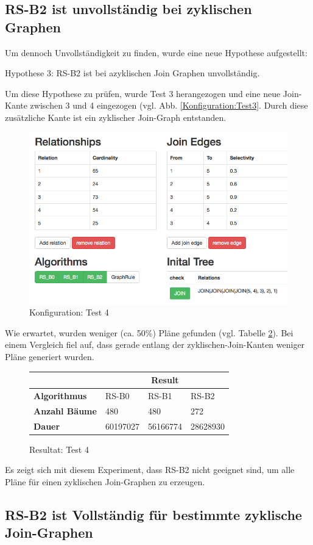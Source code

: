 \subsection{RS-B2 ist unvollständig bei zyklischen Graphen}
Um dennoch Unvollständigkeit zu finden, wurde eine neue Hypothese aufgestellt:

Hypothese 3: RS-B2 ist bei azyklischen Join Graphen unvollständig.

Um diese Hypothese zu prüfen, wurde Test 3 herangezogen und eine neue Join-Kante zwischen 3 und 4 eingezogen (vgl. Abb. \ref{Konfiguration:Test3}. Durch diese zusätzliche Kante ist ein zyklischer Join-Graph entstanden. 


\begin{figure}[ht]
  \centering
  \includegraphics[width=\textwidth]{05_ResultsEvaluation/00_media/Test4.png}
  \caption{Konfiguration: Test 4}
  \label{Konfiguration:Test4}
\end{figure}

Wie erwartet, wurden weniger (ca. 50\%) Pläne gefunden (vgl. Tabelle \ref{Result:Test4}). Bei einem Vergleich fiel auf, dass gerade entlang der zyklischen-Join-Kanten weniger Pläne generiert wurden.


\begin{figure}[h]
\centering
\begin{tabular}{|l|l|l|l|}
\hline
                         & \multicolumn{3}{c|}{{\bf Result}} \\ \hline
{\bf Algorithmus}        & RS-B0     & RS-B1     & RS-B2     \\ \hline
{\bf Anzahl Bäume}       & 480       & 480       & 272       \\ \hline
{\bf Dauer}              & 60197027  & 56166774  & 28628930  \\ \hline
\end{tabular}

\caption{Resultat: Test 4}
\label{Result:Test4}
\end{figure}

Es zeigt sich mit diesem Experiment, dass RS-B2 nicht geeignet sind, um alle Pläne für einen zyklischen Join-Graphen zu erzeugen.

\subsection{RS-B2 ist Vollständig für bestimmte zyklische Join-Graphen}







